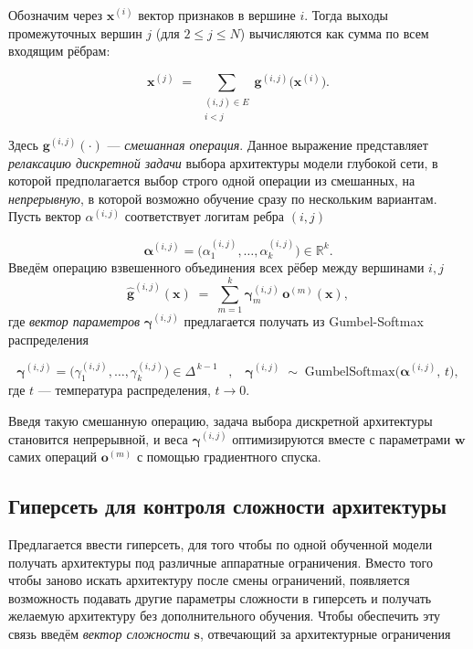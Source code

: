 \documentclass{article}
\begin{document}
Обозначим через $\boldsymbol x^{(i)}$ вектор признаков в вершине $i$. Тогда выходы промежуточных вершин $j$ (для $2 \le j \le N$) вычисляются как сумма по всем входящим рёбрам:

$$
    \boldsymbol x^{(j)} 
    \;=\; 
    \sum_{\substack{(i,j)\in E \\ i<j}} 
    \mathbf{g}^{(i,j)}\bigl(\boldsymbol x^{(i)}\bigr).
$$

Здесь $\mathbf{g}^{(i,j)}(\cdot)$ — \textit{смешанная операция}. Данное выражение представляет \textit{релаксацию дискретной задачи} выбора архитектуры модели глубокой сети, в которой предполагается выбор строго одной операции из смешанных, на \textit{непрерывную}, в которой возможно обучение сразу по нескольким вариантам. Пусть вектор $\alpha^{(i,j)}$ соответствует логитам ребра $(i,j)$

$$
    \boldsymbol{\alpha}^{(i,j)} = \bigl(\alpha^{(i,j)}_1, \dots, \alpha^{(i,j)}_k \bigr)\in \mathbb R^k.
$$
Введём операцию взвешенного объединения всех рёбер между вершинами $i,j$
$$
    \widehat{\mathbf{g}}^{(i,j)}(\boldsymbol x) 
    \;=\; 
    \sum_{m=1}^k 
    \boldsymbol\gamma^{(i,j)}_m \,\mathbf{o}^{(m)}(\boldsymbol x),
$$
где \textit{вектор параметров} $\boldsymbol{\gamma}^{(i,j)}$ предлагается получать из Gumbel-Softmax распределения

$$
    \boldsymbol{\gamma}^{(i,j)} = \bigl(\gamma^{(i,j)}_1, \dots, \gamma^{(i,j)}_k \bigr)\in \Delta^{\,k-1}
 \;\; \; , \;\;\;   \boldsymbol{\gamma}^{(i,j)} 
    \;\sim\; 
    \mathrm{GumbelSoftmax}\bigl(\boldsymbol{\alpha}^{(i,j)},\,t\bigr),
$$
где $t$ --- температура распределения, $t \rightarrow 0$.  

Введя такую смешанную операцию, задача выбора дискретной архитектуры становится непрерывной, и веса $\boldsymbol{\gamma}^{(i,j)}$ оптимизируются  вместе с параметрами $\boldsymbol{w}$ самих операций $\mathbf{o}^{(m)}$ с помощью градиентного спуска.

\subsection{Гиперсеть для контроля сложности архитектуры}

Предлагается ввести гиперсеть, для того чтобы по одной обученной модели получать архитектуры под различные аппаратные ограничения. Вместо того чтобы заново искать архитектуру после смены ограничений, появляется возможность подавать другие параметры сложности в гиперсеть и получать желаемую архитектуру без дополнительного обучения. Чтобы обеспечить эту связь введём \textit{вектор сложности} $\boldsymbol s$, отвечающий за архитектурные ограничения
\end{document}
